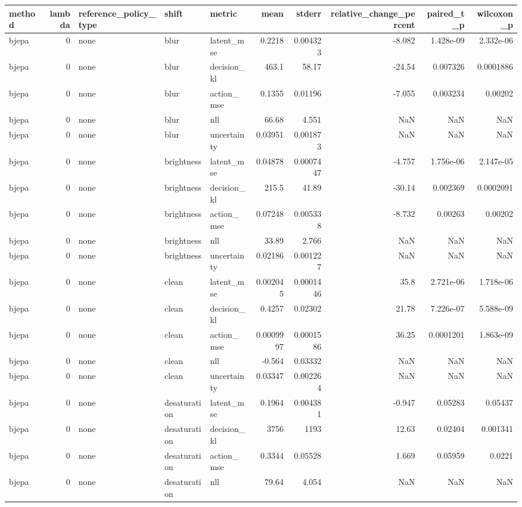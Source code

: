 \begin{tabular}{lrlllrrrrr}
\toprule
method & lambda & reference\_policy\_type & shift & metric & mean & stderr & relative\_change\_percent & paired\_t\_p & wilcoxon\_p \\
\midrule
bjepa & 0 & none & blur & latent\_mse & 0.2218 & 0.004323 & -8.082 & 1.428e-09 & 2.332e-06 \\
bjepa & 0 & none & blur & decision\_kl & 463.1 & 58.17 & -24.54 & 0.007326 & 0.0001886 \\
bjepa & 0 & none & blur & action\_mse & 0.1355 & 0.01196 & -7.055 & 0.003234 & 0.00202 \\
bjepa & 0 & none & blur & nll & 66.68 & 4.551 & NaN & NaN & NaN \\
bjepa & 0 & none & blur & uncertainty & 0.03951 & 0.001873 & NaN & NaN & NaN \\
bjepa & 0 & none & brightness & latent\_mse & 0.04878 & 0.0007447 & -4.757 & 1.756e-06 & 2.147e-05 \\
bjepa & 0 & none & brightness & decision\_kl & 215.5 & 41.89 & -30.14 & 0.002369 & 0.0002091 \\
bjepa & 0 & none & brightness & action\_mse & 0.07248 & 0.005338 & -8.732 & 0.00263 & 0.00202 \\
bjepa & 0 & none & brightness & nll & 33.89 & 2.766 & NaN & NaN & NaN \\
bjepa & 0 & none & brightness & uncertainty & 0.02186 & 0.001227 & NaN & NaN & NaN \\
bjepa & 0 & none & clean & latent\_mse & 0.002045 & 0.0001446 & 35.8 & 2.721e-06 & 1.718e-06 \\
bjepa & 0 & none & clean & decision\_kl & 0.4257 & 0.02302 & 21.78 & 7.226e-07 & 5.588e-09 \\
bjepa & 0 & none & clean & action\_mse & 0.0009997 & 0.0001586 & 36.25 & 0.0001201 & 1.863e-09 \\
bjepa & 0 & none & clean & nll & -0.564 & 0.03332 & NaN & NaN & NaN \\
bjepa & 0 & none & clean & uncertainty & 0.03347 & 0.002264 & NaN & NaN & NaN \\
bjepa & 0 & none & desaturation & latent\_mse & 0.1964 & 0.004381 & -0.947 & 0.05283 & 0.05437 \\
bjepa & 0 & none & desaturation & decision\_kl & 3756 & 1193 & 12.63 & 0.02404 & 0.001341 \\
bjepa & 0 & none & desaturation & action\_mse & 0.3344 & 0.05528 & 1.669 & 0.05959 & 0.0221 \\
bjepa & 0 & none & desaturation & nll & 79.64 & 4.054 & NaN & NaN & NaN \\

\end{tabular}
